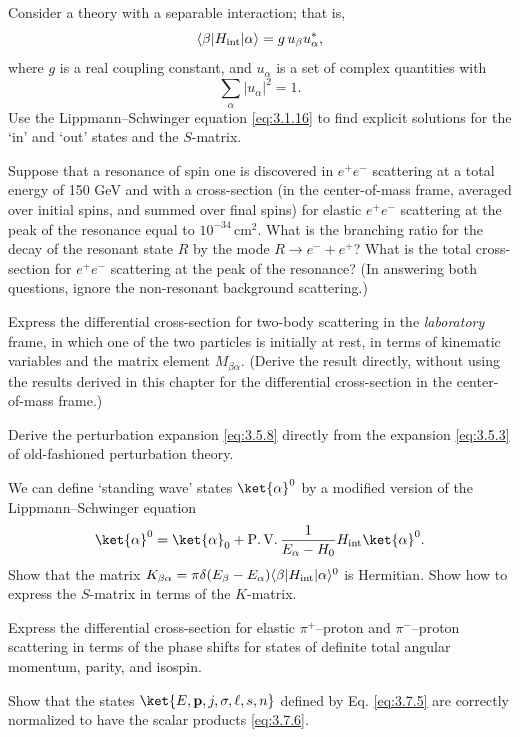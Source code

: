 
\begin{enumerate}
 Consider a theory with a separable interaction; that is,
  \[
    \langle\beta|H_{\rm int}|\alpha\rangle=g\,u_\beta u_\alpha^*,
  \]
  where $g$ is a real coupling constant, and $u_\alpha$ is a set of complex
  quantities with
  \[
    \sum_\alpha|u_\alpha|^2=1.
  \]
  Use the Lippmann--Schwinger equation \eqref{eq:3.1.16} to find explicit solutions for
  the `in' and `out' states and the $S$-matrix.

 Suppose that a resonance of spin one is discovered in $e^+e^-$
  scattering at a total energy of 150 GeV and with a cross-section (in the
  center-of-mass frame, averaged over initial spins, and summed over final
  spins) for elastic $e^+e^-$ scattering at the peak of the resonance equal to
  $10^{-34}\,\mathrm{cm}^2$. What is the branching ratio for the decay of the
  resonant state $R$ by the mode $R\to e^-+e^+$? What is the total
  cross-section for $e^+e^-$ scattering at the peak of the resonance? (In
  answering both questions, ignore the non-resonant background scattering.)

 Express the differential cross-section for two-body scattering in the
  \emph{laboratory} frame, in which one of the two particles is initially at
  rest, in terms of kinematic variables and the matrix element
  $M_{\beta\alpha}$. (Derive the result directly, without using the results
  derived in this chapter for the differential cross-section in the
  center-of-mass frame.)

 Derive the perturbation expansion \eqref{eq:3.5.8} directly from the expansion
  \eqref{eq:3.5.3} of old-fashioned perturbation theory.

 We can define `standing wave' states $\ket{\alpha}^{0}$ by a modified
  version of the Lippmann--Schwinger equation
  \[
    \ket{\alpha}^{0}=\ket{\alpha}_0
    +\operatorname{P.V.}\frac{1}{E_\alpha-H_0}
      H_{\rm int}\ket{\alpha}^{0}.
  \]
  Show that the matrix
  $K_{\beta\alpha}=\pi\delta(E_\beta-E_\alpha)
  \langle\beta|H_{\rm int}|\alpha\rangle^0$ is Hermitian. Show how to express
  the $S$-matrix in terms of the $K$-matrix.

 Express the differential cross-section for elastic $\pi^+$--proton and
  $\pi^-$--proton scattering in terms of the phase shifts for states of
  definite total angular momentum, parity, and isospin.

 Show that the states $\ket{E,\mathbf p,j,\sigma,\ell,s,n}$ defined by
  Eq. \eqref{eq:3.7.5} are correctly normalized to have the scalar products \eqref{eq:3.7.6}.
\end{enumerate}

